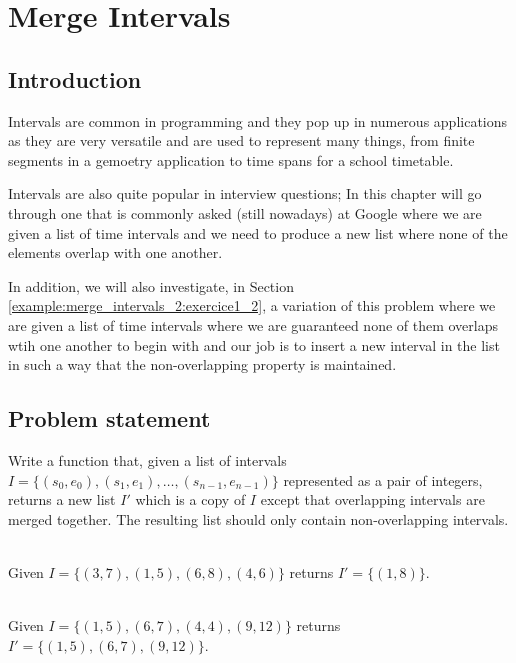 %



\chapter{Merge Intervals}
\label{ch:merge_intervals_2}
\section*{Introduction}
Intervals are common in programming and they pop up in numerous applications as they are very versatile and are used to represent many things, from finite segments in a gemoetry application to time spans for a school timetable.

Intervals are also quite popular in interview questions; In this chapter will go through one that is commonly asked (still nowadays) at Google where we are given a list of time intervals and we need to produce a new list where none of the elements overlap with one another.

In addition, we will also investigate, in Section \ref{example:merge_intervals_2:exercice1_2}, a variation of this problem where we are given a list of time intervals where we are guaranteed none of them overlaps wtih one another to begin with and our job is to insert a new interval in the list in such a way that the non-overlapping property is maintained.

\section{Problem statement}
\begin{exercise}
\label{example:merge_intervals_2:exercice1_1}
Write a function that, given a list of intervals $I=\{(s_0, e_0),(s_1, e_1), \ldots,(s_{n-1}, e_{n-1})\}$ represented as a pair of integers, returns a new list $I'$ which is a copy of $I$ except that overlapping intervals are merged together. 
The resulting list should only contain non-overlapping intervals.

	\begin{example}
		\label{example:merge_intervals_2:example1_1}
		\hfill \\
		Given $I=\{(3, 7),(1, 5), (6, 8),(4, 6)  \}$ returns $I'=\{(1,8)\}$.
	\end{example}

	\begin{example}
		\label{example:merge_intervals_2:example1_2}
		\hfill \\
		Given $I=\{(1, 5), (6, 7), (4, 4), (9, 12) \}$ returns $I'=\{(1,5),(6,7),(9,12)\}$.
	\end{example}
\end{exercise}

